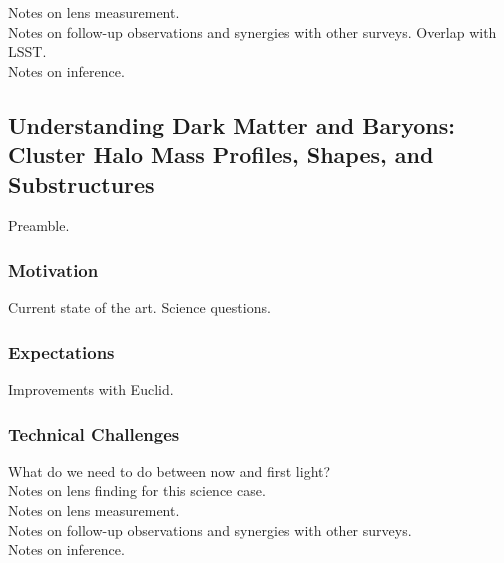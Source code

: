 \documentclass{article}
\begin{document}
Notes on lens measurement.\\

Notes on follow-up observations and synergies with other surveys. Overlap with LSST.\\

Notes on inference.\\



\subsection{Understanding Dark Matter and Baryons: Cluster Halo Mass Profiles, Shapes, and Substructures}



Preamble.

\subsubsection{Motivation}
Current state of the art. Science questions.\\

\subsubsection{Expectations}
Improvements with Euclid.\\

\subsubsection{Technical Challenges}

What do we need to do between now and first light?\\

Notes on lens finding for this science case.\\

Notes on lens measurement.\\

Notes on follow-up observations and synergies with other surveys.\\

Notes on inference.\\


\end{document}
